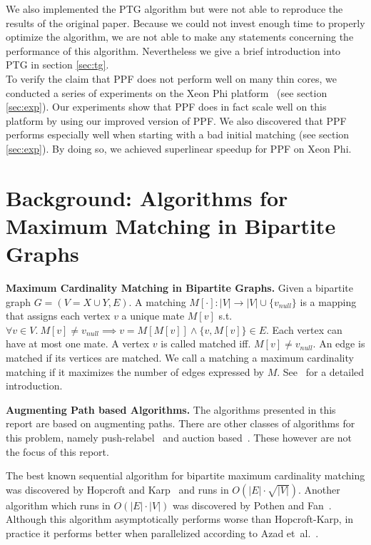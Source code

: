 \documentclass[letterpaper]{article}
\newcommand{\mypar}[1]{{\bf #1.}}
\begin{document}
We also implemented the PTG algorithm but were not able to reproduce the results of the original paper. 
Because we could not invest enough time to properly optimize the algorithm, we are not able to make any statements concerning the performance of this algorithm.
Nevertheless we give a brief introduction into PTG in section \ref{sec:tg}.\\

To verify the claim that PPF does not perform well on many thin cores, we conducted a series of experiments on the Xeon Phi platform~\cite{XeonPhi} (see section \ref{sec:exp}). 
Our experiments show that PPF does in fact scale well on this platform by using our improved version of PPF. We also discovered that PPF
performs especially well when starting with a bad initial matching (see section \ref{sec:exp}). 
By doing so, we achieved superlinear speedup for PPF on Xeon Phi.

\section{Background: Algorithms for Maximum Matching in Bipartite Graphs}\label{sec:background}

\mypar{Maximum Cardinality Matching in Bipartite Graphs}
Given a bipartite graph $G = (V = X \cup Y, E)$.
A matching $M[\cdot]: |V| \rightarrow |V| \cup \{v_{null}\}$ is a mapping that assigns each vertex $v$ a unique mate $M[v]$ s.t. 
$\forall v \in V.\ M[v] \neq v_{null} \implies v = M[M[v]] \wedge \{v, M[v]\} \in E$.
Each vertex can have at most one mate. A vertex $v$ is called matched iff. $M[v] \neq v_{null}$. An edge is matched if its vertices are matched. 
We call a matching a maximum cardinality matching if it maximizes the number of edges expressed by $M$. See~\cite{intro_alg} for a detailed introduction.

\mypar{Augmenting Path based Algorithms}
The algorithms presented in this report are based on augmenting paths. 
There are other classes of algorithms for this problem, namely push-relabel~\cite{GoldbergT88} and auction based~\cite{Bertsekas}. 
These however are not the focus of this report. 

The best known sequential algorithm for bipartite maximum cardinality matching was discovered by Hopcroft and Karp~\cite{HK:1973}
and runs in $O(|E|\cdot \sqrt{|V|})$. Another algorithm which runs in $O(|E|\cdot|V|)$ was discovered by Pothen and Fan~\cite{Pothen:1990}.
Although this algorithm asymptotically performs worse than Hopcroft-Karp, in practice it performs better when parallelized according to Azad et\ al.~\cite{Azad:2012}.
\end{document}
